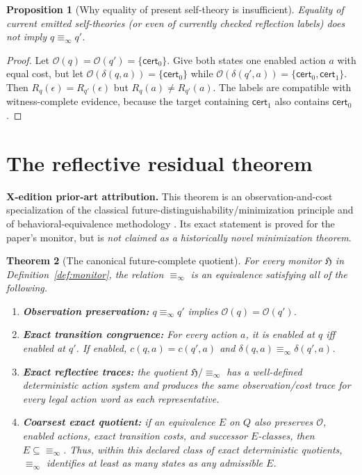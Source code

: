 \documentclass[11pt,letterpaper]{article}
\newcommand{\PriorArtNote}[1]{%
\par\smallskip\noindent\begin{minipage}{\linewidth}\small\color{black!85}%
\textbf{X-edition prior-art attribution.} #1\end{minipage}\par\smallskip}
\newtheorem{theorem}{Theorem}[section]
\newtheorem{proposition}[theorem]{Proposition}
\newcommand{\Cert}{\mathsf{cert}}
\newcommand{\Ob}{\mathcal{O}}
\newcommand{\Rinf}{\equiv_{\!\infty}}
\begin{document}
\begin{proposition}[Why equality of present self-theory is insufficient]\label{prop:theorynot}
Equality of current emitted self-theories (or even of currently checked reflection labels) does not imply $q\Rinf q'$.
\end{proposition}
\begin{proof}
Let $\Ob(q)=\Ob(q')=\{\Cert_0\}$. Give both states one enabled action $a$ with equal cost, but let $\Ob(\delta(q,a))=\{\Cert_0\}$ while $\Ob(\delta(q',a))=\{\Cert_0,\Cert_1\}$. Then $R_q(\epsilon)=R_{q'}(\epsilon)$ but $R_q(a)\ne R_{q'}(a)$. The labels are compatible with witness-complete evidence, because the target containing $\Cert_1$ also contains $\Cert_0$.
\end{proof}

\section{The reflective residual theorem}
\PriorArtNote{This theorem is an observation-and-cost specialization of the classical future-distinguishability/minimization principle \cite{nerode} and of behavioral-equivalence methodology \cite{milner}. Its exact statement is proved for the paper's monitor, but is \emph{not claimed as a historically novel minimization theorem}.}
\begin{theorem}[The canonical future-complete quotient]\label{thm:main}
For every monitor $\mathfrak H$ in Definition~\ref{def:monitor}, the relation $\Rinf$ is an equivalence satisfying all of the following.
\begin{enumerate}[label=(\roman*),leftmargin=*]
\item \textbf{Observation preservation:} $q\Rinf q'$ implies $\Ob(q)=\Ob(q')$.
\item \textbf{Exact transition congruence:} For every action $a$, it is enabled at $q$ iff enabled at $q'$. If enabled, $c(q,a)=c(q',a)$ and $\delta(q,a)\Rinf\delta(q',a)$.
\item \textbf{Exact reflective traces:} the quotient $\mathfrak H/{\Rinf}$ has a well-defined deterministic action system and produces the same observation/cost trace for every legal action word as each representative.
\item \textbf{Coarsest exact quotient:} if an equivalence $E$ on $Q$ also preserves $\Ob$, enabled actions, exact transition costs, and successor $E$-classes, then $E\subseteq\Rinf$. Thus, within this declared class of exact deterministic quotients, $\Rinf$ identifies at least as many states as any admissible $E$.
\end{enumerate}
\end{theorem}
\end{document}
